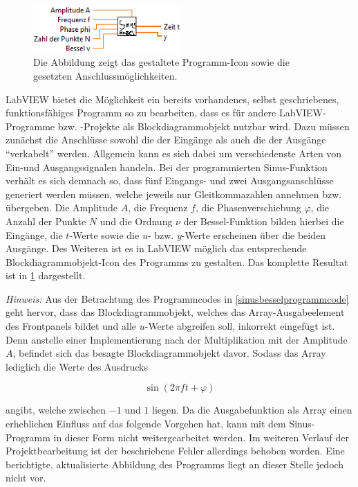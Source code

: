 \documentclass[
a4paper,
12pt,
pagesize,
ngerman
]{scrartcl}
\begin{document}
	\begin{figure}[H]
		\centering
		\includegraphics[width=0.5\textwidth]{EIRE2018Dateien/Tag1/sinusbessel-bilder/SinusBesselc}
		\caption{Die Abbildung zeigt das gestaltete Programm-Icon sowie die gesetzten Anschlussmöglichkeiten.}
		\label{sinusbesselicon}
	\end{figure}
	
	\noindent LabVIEW bietet die Möglichkeit ein bereits vorhandenes, selbst geschriebenes, funktionsfähiges Programm so zu bearbeiten, dass es für andere LabVIEW-Programme bzw. -Projekte als Blockdiagrammobjekt nutzbar wird. Dazu müssen zunächst die Anschlüsse sowohl die der Eingänge als auch die der  Ausgänge \enquote{verkabelt} werden. Allgemein kann es sich dabei um verschiedenste Arten von Ein-und Ausgangssignalen handeln. Bei der programmierten Sinus-Funktion verhält es sich demnach so, dass fünf Eingangs- und zwei Ausgangsanschlüsse generiert werden müssen, welche jeweils nur Gleitkommazahlen annehmen bzw. übergeben. Die Amplitude $A$, die Frequenz $f$, die Phasenverschiebung $\varphi$, die Anzahl der Punkte $N$ und die Ordnung $\nu$ der Bessel-Funktion bilden hierbei die Eingänge, die $t$-Werte sowie die $u$- bzw. $y$-Werte erscheinen über die beiden Ausgänge. Des Weiteren ist es in LabVIEW möglich das entsprechende Blockdiagrammobjekt-Icon des Programms zu gestalten. Das komplette Resultat ist in \cref{sinusbesselicon} dargestellt.
	
	\emph{Hinweis:} Aus der Betrachtung des Programmcodes in \cref{sinusbesselprogrammcode} geht hervor, dass das Blockdiagrammobjekt, welches das Array-Ausgabeelement des Frontpanels bildet und alle $u$-Werte abgreifen soll, inkorrekt eingefügt ist. Denn anstelle einer Implementierung nach der Multiplikation mit der Amplitude $A$, befindet sich das besagte Blockdiagrammobjekt davor. Sodass das Array lediglich die Werte des Ausdrucks
	
	\begin{equation}
	\sin(2\pi f t + \varphi)
	\end{equation}
	
	\noindent angibt, welche zwischen $-1$ und $1$ liegen. Da die Ausgabefunktion als Array einen erheblichen Einfluss auf das folgende Vorgehen hat, kann mit dem Sinus-Programm in dieser Form nicht weitergearbeitet werden. Im weiteren Verlauf der Projektbearbeitung ist der beschriebene Fehler allerdings behoben worden. Eine berichtigte, aktualisierte Abbildung des Programms liegt an dieser Stelle jedoch nicht vor.
	\label{sinus_amp_fehler}
	
\end{document}
